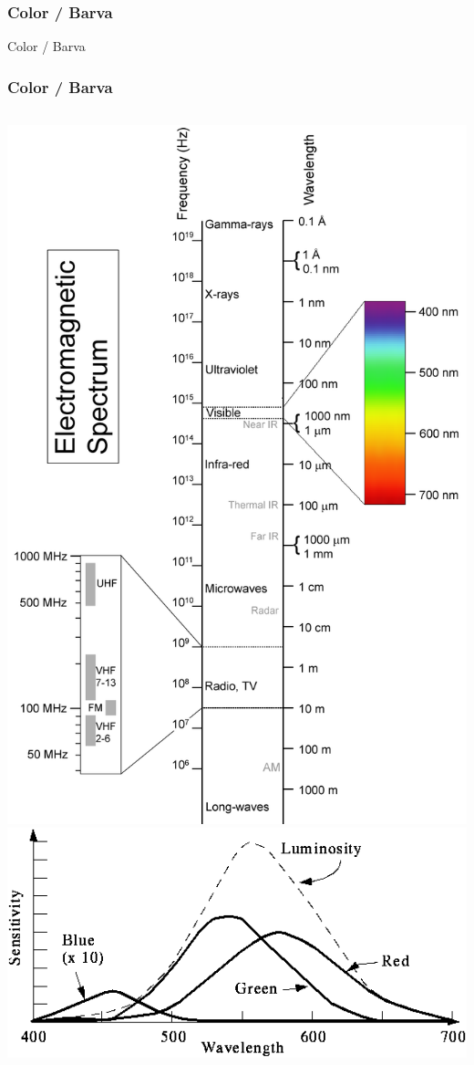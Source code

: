 \begin{frame}
\frametitle{Color / Barva}
\begin{center}
\Huge {\color{white}Color / Barva}
\end{center}
\end{frame}


\begin{frame}
    \frametitle{Color / Barva}
    \begin{columns}[c]
        \includegraphics[height=\textheight]{pics/color/Electromagnetic-Spectrum}
        \includegraphics[width=\textwidth]{pics/color/citlivost-oka}


\end{columns}
\end{frame}
